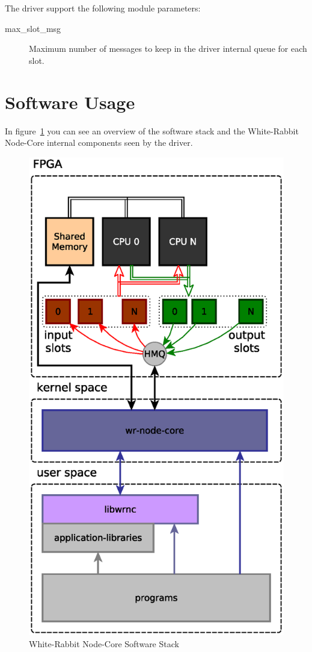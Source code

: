 \documentclass[a4paper,10pt]{article}
\begin{document}
The driver support the following module parameters:
\begin{description}
  \item[max\_slot\_msg] Maximum number of messages to keep in the
    driver internal queue for each slot.
\end{description}


\section{Software Usage}%
In figure~\ref{fig:swgenstack} you can see an overview of the software
stack and the White-Rabbit Node-Core internal components seen by the
driver.

\begin{figure}[ht]
	\centering
	\includegraphics[scale=0.5]{img/sw-gen-stack.eps}
	\caption{White-Rabbit Node-Core Software Stack}
        \label{fig:swgenstack}
\end{figure}
\end{document}
